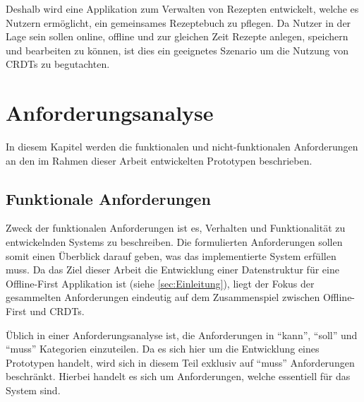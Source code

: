 \documentclass[a4paper, 12pt]{scrreprt}
\begin{document}
Deshalb wird eine Applikation zum Verwalten von Rezepten entwickelt, welche es Nutzern ermöglicht, ein gemeinsames Rezeptebuch zu pflegen. Da Nutzer in der Lage sein sollen online, offline und zur gleichen Zeit Rezepte anlegen, speichern und bearbeiten zu können, ist dies ein geeignetes Szenario um die Nutzung von CRDTs zu begutachten. 

\section{Anforderungsanalyse}
\label{sec:anforderungsanalyse}

In diesem Kapitel werden die funktionalen und nicht-funktionalen Anforderungen an den im Rahmen dieser Arbeit entwickelten Prototypen beschrieben.

\subsection{Funktionale Anforderungen}
Zweck der funktionalen Anforderungen ist es, Verhalten und Funktionalität zu entwickelnden Systems zu beschreiben. Die formulierten Anforderungen sollen somit einen Überblick darauf geben, was das implementierte System erfüllen muss. Da das Ziel dieser Arbeit die Entwicklung einer Datenstruktur für eine Offline-First Applikation ist (siehe \ref{sec:Einleitung}), liegt der Fokus der gesammelten Anforderungen eindeutig auf dem Zusammenspiel zwischen Offline-First und CRDTs.

Üblich in einer Anforderungsanalyse ist, die Anforderungen in \enquote{kann}, \enquote{soll} und \enquote{muss} Kategorien einzuteilen. Da es sich hier um die Entwicklung eines Prototypen handelt, wird sich in diesem Teil exklusiv auf \enquote{muss} Anforderungen beschränkt. Hierbei handelt es sich um Anforderungen, welche essentiell für das System sind.
\end{document}
